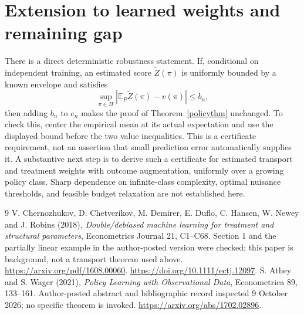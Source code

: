 \documentclass[11pt]{article}
\theoremstyle{remark}
\newcommand{\E}{\mathbb E}
\begin{document}
\section{Extension to learned weights and remaining gap}
There is a direct deterministic robustness statement. If, conditional on independent training, an estimated score $\widetilde Z(\pi)$ is uniformly bounded by a known envelope and satisfies
\[
 \sup_{\pi\in\Pi}|\E_P\widetilde Z(\pi)-v(\pi)|\leq b_n,
\]
then adding $b_n$ to $e_n$ makes the proof of Theorem~\ref{policythm} unchanged. To check this, center the empirical mean at its actual expectation and use the displayed bound before the two value inequalities. This is a certificate requirement, not an assertion that small prediction error automatically supplies it. A substantive next step is to derive such a certificate for estimated transport and treatment weights with outcome augmentation, uniformly over a growing policy class. Sharp dependence on infinite-class complexity, optimal nuisance thresholds, and feasible budget relaxation are not established here.

\begin{thebibliography}{9}
 V. Chernozhukov, D. Chetverikov, M. Demirer, E. Duflo, C. Hansen, W. Newey and J. Robins (2018), \emph{Double/debiased machine learning for treatment and structural parameters}, Econometrics Journal 21, C1--C68. Section 1 and the partially linear example in the author-posted version were checked; this paper is background, not a transport theorem used above. \url{https://arxiv.org/pdf/1608.00060}. \url{https://doi.org/10.1111/ectj.12097}.
 S. Athey and S. Wager (2021), \emph{Policy Learning with Observational Data}, Econometrica 89, 133--161. Author-posted abstract and bibliographic record inspected 9 October 2026; no specific theorem is invoked. \url{https://arxiv.org/abs/1702.02896}.
\end{thebibliography}
\end{document}
